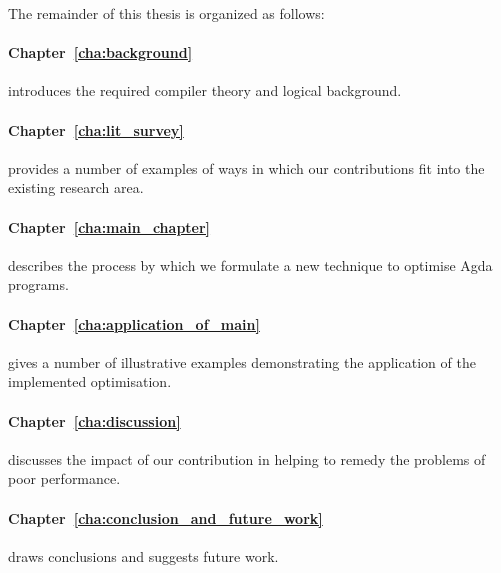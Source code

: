 The remainder of this thesis is organized as follows:

\paragraph{Chapter~\ref{cha:background}} introduces the required compiler theory and logical background.

\paragraph{Chapter~\ref{cha:lit_survey}} provides a number of examples of ways in which our contributions fit into the existing research area.

\paragraph{Chapter~\ref{cha:main_chapter}} describes the process by which we formulate a new technique to optimise Agda programs.

\paragraph{Chapter~\ref{cha:application_of_main}} gives a number of illustrative examples demonstrating the application of the implemented optimisation.

\paragraph{Chapter~\ref{cha:discussion}} discusses the impact of our contribution in helping to remedy the problems of poor performance.

\paragraph{Chapter~\ref{cha:conclusion_and_future_work}} draws conclusions and suggests future work.


